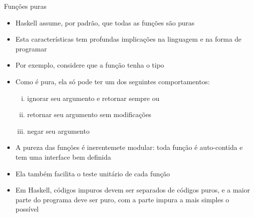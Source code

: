 \begin{frame}[fragile]{Funções puras}

    \begin{itemize}
        \item Haskell assume, por padrão, que todas as funções são puras

        \item Esta características tem profundas implicações na linguagem e na forma de programar

        \item Por exemplo, considere que a função  tenha o tipo

        \item Como  é pura, ela só pode ter um dos seguintes comportamentos:

        \begin{enumerate}[i.]
            \item ignorar seu argumento e retornar sempre  ou 

            \item retornar seu argumento sem modificações

            \item negar seu argumento
        \end{enumerate}

        \item A pureza das funções é inerentemete modular: toda função é auto-contida e tem uma
            interface bem definida

        \item Ela também facilita o teste unitário de cada função

        \item Em Haskell, códigos impuros devem ser separados de códigos puros, e a maior parte
            do programa deve ser puro, com a parte impura a mais simples o possível
    \end{itemize}

\end{frame}
